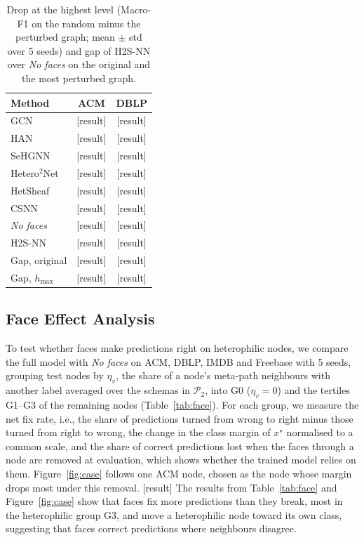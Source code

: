 \documentclass{article}
\newcommand{\method}{\textsc{H2S-NN}}
\newcommand{\res}{{\scriptsize[result]}}
\begin{document}
\begin{table}[!htbp]
  \centering
  \caption{Drop at the highest level (Macro-F1 on the random minus the perturbed graph; mean $\pm$ std over 5 seeds) and gap of \method{} over \emph{No faces} on the original and the most perturbed graph.}
  \label{tab:perturb}
  \scriptsize
  \setlength{\tabcolsep}{3pt}
  \begin{tabular}{lcc}
    \toprule
    \textbf{Method} & ACM & DBLP \\
    \midrule
    GCN & \res & \res \\
    HAN & \res & \res \\
    SeHGNN & \res & \res \\
    Hetero$^2$Net & \res & \res \\
    HetSheaf & \res & \res \\
    CSNN & \res & \res \\
    \emph{No faces} & \res & \res \\
    \method{} & \res & \res \\
    \midrule
    Gap, original & \res & \res \\
    Gap, $h_{\max}$ & \res & \res \\
    \bottomrule
  \end{tabular}
\end{table}

\subsection{Face Effect Analysis}
To test whether faces make predictions right on heterophilic nodes, we compare the full model with \emph{No faces} on ACM, DBLP, IMDB and Freebase with 5 seeds, grouping test nodes by $\eta_v$, the share of a node's meta-path neighbours with another label averaged over the schemas in $\mathcal{P}_2$, into G0 ($\eta_v=0$) and the tertiles G1--G3 of the remaining nodes (Table~\ref{tab:face}). For each group, we measure the net fix rate, i.e., the share of predictions turned from wrong to right minus those turned from right to wrong, the change in the class margin of $x^\star$ normalised to a common scale, and the share of correct predictions lost when the faces through a node are removed at evaluation, which shows whether the trained model relies on them. Figure~\ref{fig:case} follows one ACM node, chosen as the node whose margin drops most under this removal. \res{} The results from Table~\ref{tab:face} and Figure~\ref{fig:case} show that faces fix more predictions than they break, most in the heterophilic group G3, and move a heterophilic node toward its own class, suggesting that faces correct predictions where neighbours disagree.
\end{document}
